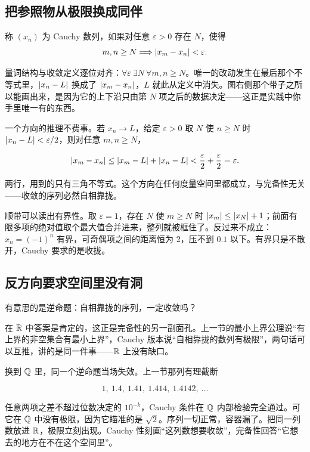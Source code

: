 \subsection{把参照物从极限换成同伴}

\begin{definition}
称 \((x_n)\) 为 Cauchy 数列，如果对任意 \(\varepsilon>0\) 存在 \(N\)，使得
\[
m,n\ge N \space\Longrightarrow\space \left|x_m-x_n\right|<\varepsilon.
\]
\end{definition}

量词结构与收敛定义逐位对齐：\(\forall\varepsilon\ \exists N\ \forall m,n\ge N\)。唯一的改动发生在最后那个不等式里，\(\left|x_n-L\right|\) 换成了 \(\left|x_m-x_n\right|\)，\(L\) 就此从定义中消失。图右侧那个带子之所以能画出来，是因为它的上下沿只由第 \(N\) 项之后的数据决定——这正是实践中你手里唯一有的东西。

一个方向的推理不费事。若 \(x_n\to L\)，给定 \(\varepsilon>0\) 取 \(N\) 使 \(n\ge N\) 时 \(\left|x_n-L\right|<\varepsilon/2\)，则对任意 \(m,n\ge N\)，

\[
\left|x_m-x_n\right| \le \left|x_m-L\right|+\left|x_n-L\right| < \frac{\varepsilon}{2}+\frac{\varepsilon}{2} = \varepsilon.
\]

两行，用到的只有三角不等式。这个方向在任何度量空间里都成立，与完备性无关——收敛的序列必然自相靠拢。

顺带可以读出有界性。取 \(\varepsilon=1\)，存在 \(N\) 使 \(m\ge N\) 时 \(\left|x_m\right|\le\left|x_N\right|+1\)；前面有限多项的绝对值取个最大值合并进来，整列就被框住了。反过来不成立：\(x_n=(-1)^n\) 有界，可奇偶项之间的距离恒为 2，压不到 \(0.1\) 以下。有界只是不散开，Cauchy 要求的是收拢。

\subsection{反方向要求空间里没有洞}

有意思的是逆命题：自相靠拢的序列，一定收敛吗？

在 \(\mathbb{R}\) 中答案是肯定的，这正是完备性的另一副面孔。上一节的最小上界公理说``有上界的非空集合有最小上界''，Cauchy 版本说``自相靠拢的数列有极限''，两句话可以互推，讲的是同一件事——\(\mathbb{R}\) 上没有缺口。

换到 \(\mathbb{Q}\) 里，同一个逆命题当场失效。上一节那列有理截断

\[
1,\ 1.4,\ 1.41,\ 1.414,\ 1.4142,\ \ldots
\]

任意两项之差不超过位数决定的 \(10^{-k}\)，Cauchy 条件在 \(\mathbb{Q}\) 内部检验完全通过。可它在 \(\mathbb{Q}\) 中没有极限，因为它瞄准的是 \(\sqrt2\)。序列一切正常，容器漏了。把同一列数放进 \(\mathbb{R}\)，极限立刻出现。Cauchy 性刻画``这列数想要收敛''，完备性回答``它想去的地方在不在这个空间里''。

